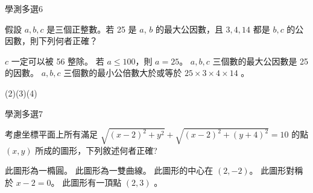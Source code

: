 \begin{QUESTIONS}
    \begin{QUESTION}
        \begin{ExamInfo}{95}{學測}{多選}{6}
        \end{ExamInfo}
        \begin{ExamAnsRateInfo}{15}{27}{8}{10}
        \end{ExamAnsRateInfo}
        \begin{QBODY}
            假設 $a, b, c$ 是三個正整數。若 25 是 $a$, $b$ 的最大公因數，且 $3,4,14$ 都是 $b,c$ 的公因數，則下列何者正確？
				\begin{QOPS} 
					\QOP $c$ 一定可以被 56 整除。 
					\QOP 若 $a \leq 100$，則 $a=25$。 
					\QOP $a, b, c$ 三個數的最大公因數是 25	的因數。
					\QOP $a,b,c$ 三個數的最小公倍數大於或等於 $25 \times 3 \times 4 \times 14$ 。
				\end{QOPS}
        \end{QBODY}
        \begin{QFROMS}
        \end{QFROMS}
        \begin{QTAGS}\end{QTAGS}
        \begin{QANS}
            (2)(3)(4)
        \end{QANS}
        \begin{QSOLLIST}
        \end{QSOLLIST}
        \begin{QEMPTYSPACE}
        \end{QEMPTYSPACE}
    \end{QUESTION}
    \begin{QUESTION}
        \begin{ExamInfo}{95}{學測}{多選}{7}
        \end{ExamInfo}
        \begin{ExamAnsRateInfo}{47}{83}{44}{14}
        \end{ExamAnsRateInfo}
        \begin{QBODY}
            考慮坐標平面上所有滿足 $\sqrt{(x-2)^2 +y^2} + \sqrt{(x-2)^2 +(y+4)^2} =10$ 的點 $(x,y)$ 所成的圖形，下列敘述何者正確? 
			\begin{QOPS} 
				\QOP 此圖形為一橢圓。
				\QOP 此圖形為一雙曲線。 
				\QOP 此圖形的中心在 $(2,-2)$。
				\QOP 此圖形對稱於 $x-2=0$。    
				\QOP 此圖形有一頂點 $(2, 3)$ 。
			\end{QOPS}
        \end{QBODY}

\end{QUESTION}
\end{QUESTIONS}
